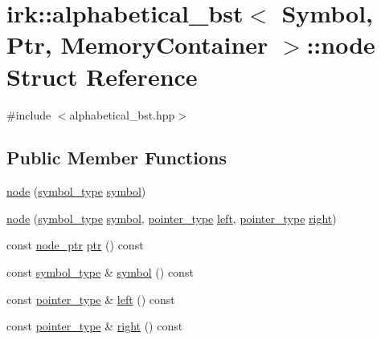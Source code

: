 \hypertarget{structirk_1_1alphabetical__bst_1_1node}{}\section{irk\+:\+:alphabetical\+\_\+bst$<$ Symbol, Ptr, Memory\+Container $>$\+:\+:node Struct Reference}
\label{structirk_1_1alphabetical__bst_1_1node}


{\ttfamily \#include $<$alphabetical\+\_\+bst.\+hpp$>$}

\subsection*{Public Member Functions}
\begin{DoxyCompactItemize}
\item 
\mbox{\hyperlink{structirk_1_1alphabetical__bst_1_1node_a5b892f196ffd2c8c732b7a230097dd42}{node}} (\mbox{\hyperlink{classirk_1_1alphabetical__bst_a296ccb8fa9fa9dce3b3c3beab0a5ca28}{symbol\+\_\+type}} \mbox{\hyperlink{porter2_8hpp_a04438e24473719aaf288c57833717164}{symbol}})
\item 
\mbox{\hyperlink{structirk_1_1alphabetical__bst_1_1node_add6fee4d8429568f4caa72a221279470}{node}} (\mbox{\hyperlink{classirk_1_1alphabetical__bst_a296ccb8fa9fa9dce3b3c3beab0a5ca28}{symbol\+\_\+type}} \mbox{\hyperlink{porter2_8hpp_a04438e24473719aaf288c57833717164}{symbol}}, \mbox{\hyperlink{classirk_1_1alphabetical__bst_ae689c05ab96a71769e24908d5c73765c}{pointer\+\_\+type}} \mbox{\hyperlink{structirk_1_1alphabetical__bst_1_1node_a995b2b1dfc64e83e43c4de3585f216f5}{left}}, \mbox{\hyperlink{classirk_1_1alphabetical__bst_ae689c05ab96a71769e24908d5c73765c}{pointer\+\_\+type}} \mbox{\hyperlink{structirk_1_1alphabetical__bst_1_1node_a0d8c0916eb71b6d6025660674ac964dd}{right}})
\item 
const \mbox{\hyperlink{structirk_1_1alphabetical__bst_1_1node__ptr}{node\+\_\+ptr}} \mbox{\hyperlink{structirk_1_1alphabetical__bst_1_1node_a9ec39a805a09afaf00b9bdb21ec5cb82}{ptr}} () const
\item 
const \mbox{\hyperlink{classirk_1_1alphabetical__bst_a296ccb8fa9fa9dce3b3c3beab0a5ca28}{symbol\+\_\+type}} \& \mbox{\hyperlink{structirk_1_1alphabetical__bst_1_1node_ad4eda9986a848303569207ecfd7c9252}{symbol}} () const
\item 
const \mbox{\hyperlink{classirk_1_1alphabetical__bst_ae689c05ab96a71769e24908d5c73765c}{pointer\+\_\+type}} \& \mbox{\hyperlink{structirk_1_1alphabetical__bst_1_1node_a995b2b1dfc64e83e43c4de3585f216f5}{left}} () const
\item 
const \mbox{\hyperlink{classirk_1_1alphabetical__bst_ae689c05ab96a71769e24908d5c73765c}{pointer\+\_\+type}} \& \mbox{\hyperlink{structirk_1_1alphabetical__bst_1_1node_a0d8c0916eb71b6d6025660674ac964dd}{right}} () const
\end{DoxyCompactItemize}
